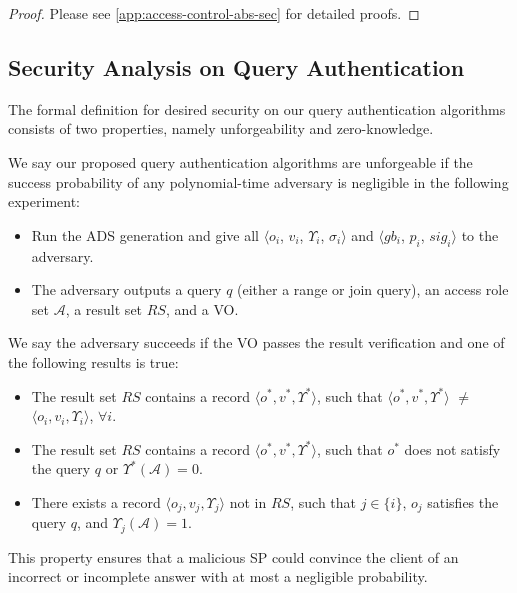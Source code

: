 \begin{proof}
  Please see \cref{app:access-control-abs-sec} for detailed proofs.
\end{proof}

\subsection{Security Analysis on Query Authentication}\label{sec:access-control:security-analysis-query}

The formal definition for desired security on our query authentication algorithms consists of two properties, namely unforgeability and zero-knowledge.

\begin{definition}[Unforgeability]\label{def:access-control:query-secure}
  We say our proposed query authentication algorithms are unforgeable if the success probability of any polynomial-time adversary is negligible in the following experiment:
  \begin{itemize}
    \item Run the ADS generation and give all $\langle o_i$, $v_i$, $\Upsilon_i$, $\sigma_i\rangle$ and $\langle gb_i$, $p_i$, $sig_i\rangle$ to the adversary.
    \item The adversary outputs a query $q$ (either a range or join query), an access role set $\mathcal{A}$, a result set $RS$, and a VO\@.
  \end{itemize}
  We say the adversary succeeds if the VO passes the result verification and one of the following results is true:
  \begin{itemize}
    \item The result set $RS$ contains a record $\langle o^*, v^*, \Upsilon^*\rangle$, such that $\langle o^*, v^*, \Upsilon^*\rangle$ $\neq$ $\langle o_i, v_i, \Upsilon_i\rangle$, $\forall i$.
    \item The result set $RS$ contains a record $\langle o^*, v^*, \Upsilon^*\rangle$, such that $o^*$ does not satisfy the query $q$ or $\Upsilon^*(\mathcal{A}) = 0$.
    \item There exists a record $\langle o_j, v_j, \Upsilon_j\rangle$ not in $RS$, such that $j \in \{i\}$, $o_j$ satisfies the query $q$, and $\Upsilon_j(\mathcal{A})= 1$.
  \end{itemize}
\end{definition}

This property ensures that a malicious SP could convince the client of an incorrect or incomplete answer with at most a negligible probability.

